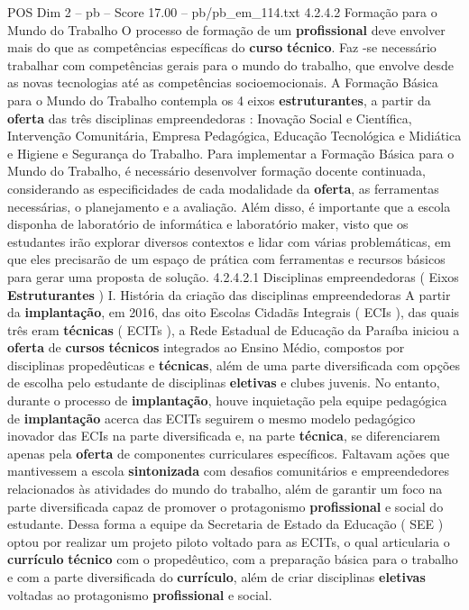 \begin{textsample}{POS Dim 2 – pb – Score 17.00 – pb/pb\_em\_114.txt}  \label{ex:f2_pos_280}
4.2.4.2 Formação para o Mundo do Trabalho O processo de formação de um \textbf{profissional} deve envolver mais do que as competências específicas do \textbf{curso} \textbf{técnico}.
Faz -se necessário trabalhar com competências gerais para o mundo do trabalho, que envolve desde as novas tecnologias até as competências socioemocionais.
A Formação Básica para o Mundo do Trabalho contempla os 4 eixos \textbf{estruturantes}, a partir da \textbf{oferta} das três disciplinas empreendedoras : Inovação Social e Científica, Intervenção Comunitária, Empresa Pedagógica, Educação Tecnológica e Midiática e Higiene e Segurança do Trabalho.
Para implementar a Formação Básica para o Mundo do Trabalho, é necessário desenvolver formação docente continuada, considerando as especificidades de cada modalidade da \textbf{oferta}, as ferramentas necessárias, o planejamento e a avaliação.
Além disso, é importante que a escola disponha de laboratório de informática e laboratório maker, visto que os estudantes irão explorar diversos contextos e lidar com várias problemáticas, em que eles precisarão de um espaço de prática com ferramentas e recursos básicos para gerar uma proposta de solução. 4.2.4.2.1 Disciplinas empreendedoras ( Eixos \textbf{Estruturantes} ) I.
História da criação das disciplinas empreendedoras A partir da \textbf{implantação}, em 2016, das oito Escolas Cidadãs Integrais ( ECIs ), das quais três eram \textbf{técnicas} ( ECITs ), a Rede Estadual de Educação da Paraíba iniciou a \textbf{oferta} de \textbf{cursos} \textbf{técnicos} integrados ao Ensino Médio, compostos por disciplinas propedêuticas e \textbf{técnicas}, além de uma parte diversificada com opções de escolha pelo estudante de disciplinas \textbf{eletivas} e clubes juvenis.
No entanto, durante o processo de \textbf{implantação}, houve inquietação pela equipe pedagógica de \textbf{implantação} acerca das ECITs seguirem o mesmo modelo pedagógico inovador das ECIs na parte diversificada e, na parte \textbf{técnica}, se diferenciarem apenas pela \textbf{oferta} de componentes curriculares específicos.
Faltavam ações que mantivessem a escola \textbf{sintonizada} com desafios comunitários e empreendedores relacionados às atividades do mundo do trabalho, além de garantir um foco na parte diversificada capaz de promover o protagonismo \textbf{profissional} e social do estudante.
Dessa forma a equipe da Secretaria de Estado da Educação ( SEE ) optou por realizar um projeto piloto voltado para as ECITs, o qual articularia o \textbf{currículo} \textbf{técnico} com o propedêutico, com a preparação básica para o trabalho e com a parte diversificada do \textbf{currículo}, além de criar disciplinas \textbf{eletivas} voltadas ao protagonismo \textbf{profissional} e social.

\end{textsample}
